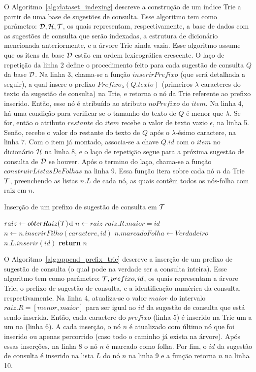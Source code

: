 O Algoritmo~\ref{alg:dataset_indexing} descreve a construção de um índice Trie a partir de uma base de sugestões de consulta. Esse algoritmo tem como parâmetro: $\mathcal{D}, \mathcal{H}, \mathcal{T}$, os quais representam, respectivamente, a base de dados com as sugestões de consulta que serão indexadas, a estrutura de dicionário mencionada anteriormente, e a árvore Trie ainda vazia. Esse algoritmo assume que os itens da base $\mathcal{D}$ estão em ordem lexicográfica crescente. O laço de repetição da linha 2 define o procedimento feito para cada sugestão de consulta $Q$ da base $\mathcal{D}$. Na linha 3, chama-se a função $inserirPrefixo$ (que será detalhada a seguir), a qual insere o prefixo $Prefixo_{\lambda}(Q.texto)$ (primeiros $\lambda$ caracteres do texto da sugestão de consulta) na Trie, e retorna o nó da Trie referente ao prefixo inserido. Então, esse nó é atribuído ao atributo $noPrefixo$ do $item$. Na linha 4, há uma condição para verificar se o tamanho do texto de $Q$ é menor que $\lambda$. Se for, então o atributo $restante$ do $item$ recebe o valor de texto vazio $\epsilon$, na linha 5. Senão, recebe o valor do restante do texto de $Q$ após o $\lambda$-ésimo caractere, na linha 7. Com o item já montado, associa-se a chave $Q.id$ com o $item$ no dicionário $\mathcal{H}$ na linha 8, e o laço de repetição segue para a próxima sugestão de consulta de $\mathcal{D}$ se houver. Após o termino do laço, chama-se a função $construirListasDeFolhas$ na linha 9. Essa função itera sobre cada nó $n$ da Trie  $\mathcal{T}$, preenchendo as listas $n.L$ de cada nó, as quais contêm todos os nós-folha com raiz em $n$.


\begin{algorithm}[H]
\caption{Inserção de um prefixo de sugestão de consulta em $\mathcal{T}$}\label{alg:append_prefix_trie}
\begin{algorithmic}[1]
    \State $raiz \leftarrow obterRaiz(\mathcal{T})$d
    \State $n \leftarrow raiz$
    \State $raiz.R.maior = id$
        \State $n \leftarrow n.inserirFilho(caractere, id)$
    \EndFor
    \State $n.marcadoFolha \leftarrow Verdadeiro$
    \State $n.L.inserir(id)$
    \State \textbf{return} $n$
\EndFunction
\end{algorithmic}
\end{algorithm}

O Algoritmo~\ref{alg:append_prefix_trie} descreve a inserção de um prefixo de sugestão de consulta (o qual pode na verdade ser a consulta inteira). Esse algoritmo tem como parâmetro: $\mathcal{T}, prefixo, id$, os quais representam a árvore Trie, o prefixo de sugestão de consulta, e a identificação numérica da consulta, respectivamente. Na linha 4, atualiza-se o valor $maior$ do intervalo $raiz.R = [menor, maior]$ para ser igual ao $id$ da sugestão de consulta que está sendo inserida. Então, cada caractere do $prefixo$ (linha 5) é inserido na Trie um a um na (linha 6). A cada inserção, o nó $n$ é atualizado com último nó que foi inserido ou apenas percorrido (caso todo o caminho já exista na árvore). Após essas inserções, na linha 8 o nó $n$ é marcado como folha. Por fim, o $id$ da sugestão de consulta é inserido na lista $L$ do nó $n$ na linha 9 e a função retorna $n$ na linha 10. 

